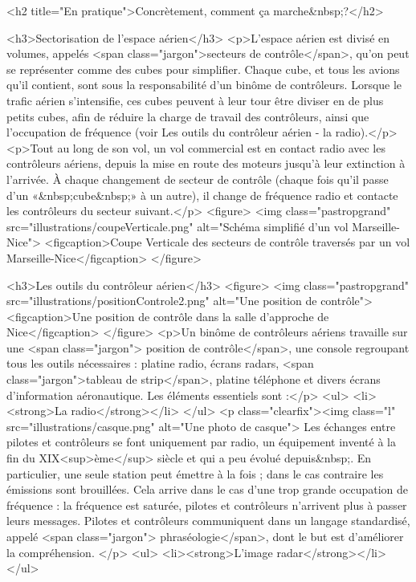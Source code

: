 \documentclass[11pt]{article}
\begin{document}
				\begin{code2} 
			<h2 title="En pratique">Concrètement, comment ça marche&nbsp;?</h2>

			<h3>Sectorisation de l'espace aérien</h3>
			<p>L'espace aérien est divisé en volumes, appelés <span class="jargon">secteurs de contrôle</span>, qu'on peut se représenter comme des cubes pour simplifier. Chaque cube, et tous les avions qu'il contient, sont sous la responsabilité d'un binôme de contrôleurs. Lorsque le trafic aérien s'intensifie, ces cubes peuvent à leur tour être diviser en de plus petits cubes, afin de réduire la charge de travail des contrôleurs, ainsi que l'occupation de fréquence (voir Les outils du contrôleur aérien - la radio).</p>
			<p>Tout au long de son vol, un vol commercial est en contact radio avec les contrôleurs aériens, depuis la mise en route des moteurs jusqu'à leur extinction à l'arrivée. À chaque changement de secteur de contrôle (chaque fois qu'il passe d'un «&nbsp;cube&nbsp;» à un autre), il change de fréquence radio et contacte les contrôleurs du secteur suivant.</p>
			<figure>
				<img class="pastropgrand" src="illustrations/coupeVerticale.png" alt="Schéma simplifié d'un vol Marseille-Nice">
				<figcaption>Coupe Verticale des secteurs de contrôle traversés par un vol Marseille-Nice</figcaption>
			</figure>

			<h3>Les outils du contrôleur aérien</h3>
			<figure>
				<img class="pastropgrand" src="illustrations/positionControle2.png" alt="Une position de contrôle">
				<figcaption>Une position de contrôle dans la salle d'approche de Nice</figcaption>
			</figure>
			<p>Un binôme de contrôleurs aériens travaille sur une <span class="jargon"> position de contrôle</span>, une console regroupant tous les outils nécessaires : platine radio, écrans radars, <span class="jargon">tableau de strip</span>, platine téléphone et divers écrans d'information aéronautique. Les éléments essentiels sont :</p>
			<ul>
				<li><strong>La radio</strong></li>
			</ul>
			<p class="clearfix"><img class="l" src="illustrations/casque.png" alt="Une photo de casque"> Les échanges entre pilotes et contrôleurs se font uniquement par radio, un équipement inventé à la fin du XIX<sup>ème</sup> siècle et qui a peu évolué depuis&nbsp;. En particulier, une seule station peut émettre à la fois ; dans le cas contraire les émissions sont brouillées. Cela arrive dans le cas d'une trop grande occupation de fréquence : la fréquence est saturée, pilotes et contrôleurs n'arrivent plus à passer leurs messages. Pilotes et contrôleurs communiquent dans un langage standardisé, appelé <span class="jargon"> phraséologie</span>, dont le but est d'améliorer la compréhension. </p>
			<ul>
				<li><strong>L'image radar</strong></li>
			</ul>\end{code2}
\end{document}
